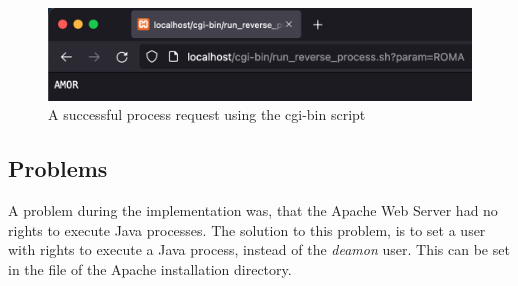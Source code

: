 \begin{figure}[h]
\centering
\includegraphics[scale=0.6]{images/part2Success}
\caption{A successful process request using the cgi-bin script}
\label{fig:02_part2_impl_success}
\end{figure}

\subsection{Problems}\label{subsec:02_part2_concl}
A problem during the implementation was, that the Apache Web Server had no rights to execute Java processes. The solution to this problem, is to set a user with rights to execute a Java process, instead of the \textit{deamon} user. This can be set in the  file of the Apache installation directory.